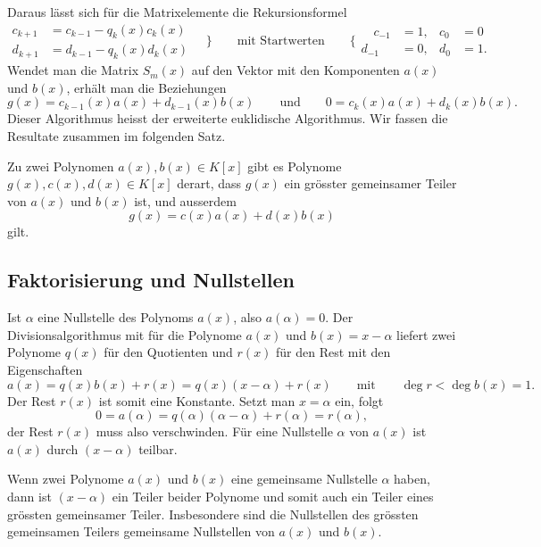 Daraus lässt sich für die Matrixelemente die Rekursionsformel
\[
\begin{aligned}
c_{k+1} &= c_{k-1} - q_k(x) c_k(x) \\
d_{k+1} &= d_{k-1} - q_k(x) d_k(x)
\end{aligned}
\quad
\bigg\}
\qquad
\text{mit Startwerten}
\qquad
\bigg\{
\begin{aligned}
\quad
c_{-1} &= 1, & c_0 &= 0 \\
d_{-1} &= 0, & d_0 &= 1.
\end{aligned}
\]
Wendet man die Matrix $S_m(x)$ auf den Vektor mit den Komponenten
$a(x)$ und $b(x)$, erhält man die Beziehungen
\[
g(x) = c_{k-1}(x) a(x) + d_{k-1}(x) b(x)
\qquad\text{und}\qquad
0 = c_k(x) a(x) + d_k(x) b(x).
\]
Dieser Algorithmus heisst der erweiterte euklidische Algorithmus.
Wir fassen die Resultate zusammen im folgenden Satz.

\begin{satz}
Zu zwei Polynomen $a(x),b(x) \in K[x]$ gibt es Polynome
$g(x),c(x),d(x)\in K[x]$
derart, dass $g(x)$ ein grösster gemeinsamer Teiler von $a(x)$ und $b(x)$
ist, und ausserdem
\[
g(x) = c(x)a(x)+d(x)b(x)
\]
gilt.
\end{satz}

%
%
\subsection{Faktorisierung und Nullstellen}
Ist $\alpha$ eine Nullstelle des Polynoms $a(x)$, also $a(\alpha)=0$.
Der Divisionsalgorithmus mit für die Polynome $a(x)$ und $b(x)=x-\alpha$
liefert zwei Polynome $q(x)$ für den Quotienten und $r(x)$ für den Rest
mit den Eigenschaften
\[
a(x)
=
q(x) b(x)
+r(x)
=
q(x)(x-\alpha)+r(x)
\qquad\text{mit}\qquad
\deg r < \deg b(x)=1.
\]
Der Rest $r(x)$ ist somit eine Konstante. 
Setzt man $x=\alpha$ ein, folgt
\[
0
=
a(\alpha)
=
q(\alpha)(\alpha-\alpha)+r(\alpha)
=
r(\alpha),
\]
der Rest $r(x)$ muss also verschwinden.
Für eine Nullstelle $\alpha$ von $a(x)$ ist $a(x)$ durch $(x-\alpha)$
teilbar.

Wenn zwei Polynome $a(x)$ und $b(x)$ eine gemeinsame Nullstelle $\alpha$
haben, dann ist $(x-\alpha)$ ein Teiler beider Polynome und somit auch
ein Teiler eines grössten gemeinsamer Teiler.
Insbesondere sind die Nullstellen des grössten gemeinsamen Teilers
gemeinsame Nullstellen von $a(x)$ und $b(x)$.

